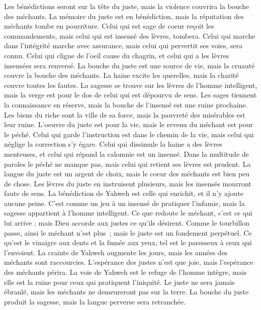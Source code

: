 \begin{multicols}{2}
Les bénédictions seront sur la tête du juste, mais la violence couvrira la bouche des méchants.
La mémoire du juste est en bénédiction, mais la réputation des méchants tombe en pourriture.
Celui qui est sage de coeur reçoit les commandements, mais celui qui est insensé des lèvres, tombera.
Celui qui marche dans l'intégrité marche avec assurance, mais celui qui pervertit ses voies, sera connu.
Celui qui cligne de l'oeil cause du chagrin, et celui qui a les lèvres insensées sera renversé.
La bouche du juste est une source de vie, mais la cruauté couvre la bouche des méchants.
La haine excite les querelles, mais la charité couvre toutes les fautes.
La sagesse se trouve sur les lèvres de l'homme intelligent, mais la verge est pour le dos de celui qui est dépourvu de sens.
Les sages tiennent la connaissance en réserve, mais la bouche de l’insensé est une ruine prochaine.
Les biens du riche sont la ville de sa force, mais la pauvreté des misérables est leur ruine.
L'oeuvre du juste est pour la vie, mais le revenu du méchant est pour le péché.
Celui qui garde l'instruction est dans le chemin de la vie, mais celui qui néglige la correction s’y égare.
Celui qui dissimule la haine a des lèvres menteuses, et celui qui répand la calomnie est un insensé.
Dans la multitude de paroles le péché ne manque pas, mais celui qui retient ses lèvres est prudent.
La langue du juste est un argent de choix, mais le coeur des méchants est bien peu de chose.
Les lèvres du juste en instruisent plusieurs, mais les insensés mourront faute de sens.
La bénédiction de Yahweh est celle qui enrichit, et il n'y ajoute aucune peine.
C'est comme un jeu à un insensé de pratiquer l’infamie, mais la sagesse appartient à l'homme intelligent.
Ce que redoute le méchant, c’est ce qui lui arrive ; mais Dieu accorde aux justes ce qu'ils désirent.
Comme le tourbillon passe, ainsi le méchant n’est plus ; mais le juste est un fondement perpétuel.
Ce qu'est le vinaigre aux dents et la fumée aux yeux, tel est le paresseux à ceux qui l'envoient.
La crainte de Yahweh augmente les jours, mais les années des méchants sont raccourcies.
L'espérance des justes n'est que joie, mais l’espérance des méchants périra.
La voie de Yahweh est le refuge de l'homme intègre, mais elle est la ruine pour ceux qui pratiquent l'iniquité.
Le juste ne sera jamais ébranlé, mais les méchants ne demeureront pas sur la terre.
La bouche du juste produit la sagesse, mais la langue perverse sera retranchée.

\end{multicols}
